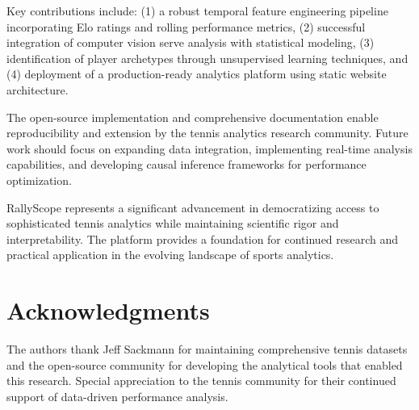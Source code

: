 \documentclass[11pt,a4paper]{article}
\begin{document}
Key contributions include: (1) a robust temporal feature engineering pipeline incorporating Elo ratings and rolling performance metrics, (2) successful integration of computer vision serve analysis with statistical modeling, (3) identification of player archetypes through unsupervised learning techniques, and (4) deployment of a production-ready analytics platform using static website architecture.

The open-source implementation and comprehensive documentation enable reproducibility and extension by the tennis analytics research community. Future work should focus on expanding data integration, implementing real-time analysis capabilities, and developing causal inference frameworks for performance optimization.

RallyScope represents a significant advancement in democratizing access to sophisticated tennis analytics while maintaining scientific rigor and interpretability. The platform provides a foundation for continued research and practical application in the evolving landscape of sports analytics.

\section*{Acknowledgments}

The authors thank Jeff Sackmann for maintaining comprehensive tennis datasets and the open-source community for developing the analytical tools that enabled this research. Special appreciation to the tennis community for their continued support of data-driven performance analysis.
\end{document}
